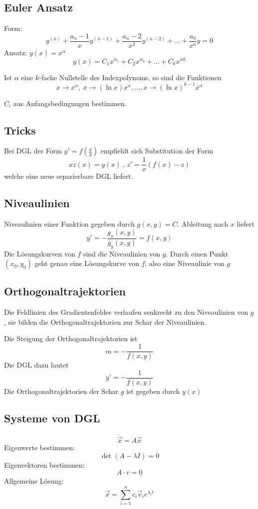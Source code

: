 	\subsection{Euler Ansatz} %
		Form:
		\[
			y^{(n)} + \frac{a_n-1}{x} y^{(n-1)} + \frac{a_n-2}{x^2} y^{(n-2)} + \dots + \frac{a_0}{x^n} y = 0
		\]
		Ansatz: $y(x) = x^{\alpha}$
		\[
			y(x) = C_1 x^{\alpha_1} + C_2 x^{\alpha_2} + \dots + C_k x^{\alpha k}
		\]
		
		Ist $\alpha$ eine $k$-fache Nullstelle des Indexpolynoms, so sind die Funktionen
		\[
			x \to x^\alpha, \ x \to (\ln x)x^\alpha, \dots, x \to (\ln x)^{k-1}x^\alpha
		\]
		
		$C_i$ aus Anfangsbedingungen bestimmen.
	\subsection{Tricks} %
		Bei DGL der Form $y' = f(\frac{x}{y})$ empfiehlt sich Substitution der Form
		\[
			xz(x) = y(x)\ ,\, z' = \frac{1}{x} (f(x) - z)
		\]
		welche eine neue separierbare DGL liefert.
	\subsection{Niveaulinien} %
		Niveaulinien einer Funktion gegeben durch $g(x,y) = C$.
		Ableitung nach $x$ liefert
		\[
			y' = - \frac{g_x(x,y)}{g_y(x,y)} = f(x,y)
		\]
		Die Lösungskurven von $f$ sind die Niveaulinien von $g$.
		Durch einen Punkt $(x_0, y_0)$ geht genau eine Lösungskurve von $f$, also eine Niveaulinie von $g$
	\subsection{Orthogonaltrajektorien} %
		Die Feldlinien des Gradientenfeldes verlaufen senkrecht zu den Niveaulinien von $g$, sie bilden die Orthogonaltrajektorien zur Schar der Niveaulinien.
		
		Die Steigung der Orthogonaltrajektorien ist
		\[
			m = - \frac{1}{f(x,y)}
		\]
		Die DGL dazu lautet
		\[
			y' = - \frac{1}{f(x,y)}
		\]
		Die Orthogonaltrajektorien der Schar $g$ ist gegeben durch $y(x)$
	\subsection{Systeme von DGL} %
		\[
			\dot{\vec{x}} = A \vec{x}
		\]
		Eigenwerte bestimmen:
		\[
			\det(A - \lambda I) = 0
		\]
		Eigenvektoren bestimmen:
		\[
			A \cdot v = \underline{0}
		\]
		Allgemeine Lösung:
		\[
			\vec{x} = \sum_{i=1}^n c_i \vec{v}_i e^{\lambda_i t}
		\]
		
